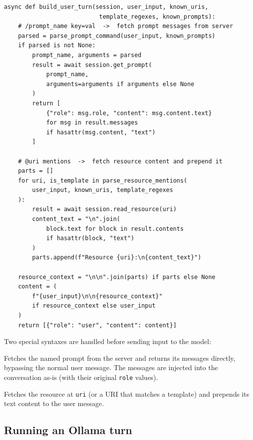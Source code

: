 \documentclass[11pt, a4paper]{article}
\begin{document}
\begin{lstlisting}[caption={build\_user\_turn}]
async def build_user_turn(session, user_input, known_uris,
                           template_regexes, known_prompts):
    # /prompt_name key=val  ->  fetch prompt messages from server
    parsed = parse_prompt_command(user_input, known_prompts)
    if parsed is not None:
        prompt_name, arguments = parsed
        result = await session.get_prompt(
            prompt_name,
            arguments=arguments if arguments else None
        )
        return [
            {"role": msg.role, "content": msg.content.text}
            for msg in result.messages
            if hasattr(msg.content, "text")
        ]

    # @uri mentions  ->  fetch resource content and prepend it
    parts = []
    for uri, is_template in parse_resource_mentions(
        user_input, known_uris, template_regexes
    ):
        result = await session.read_resource(uri)
        content_text = "\n".join(
            block.text for block in result.contents
            if hasattr(block, "text")
        )
        parts.append(f"Resource {uri}:\n{content_text}")

    resource_context = "\n\n".join(parts) if parts else None
    content = (
        f"{user_input}\n\n{resource_context}"
        if resource_context else user_input
    )
    return [{"role": "user", "content": content}]
\end{lstlisting}

Two special syntaxes are handled before sending input to the model:

\begin{description}[leftmargin=3em]
  \item[\texttt{/prompt\_name [key=val \ldots]}] Fetches the named prompt from the server and returns its messages directly, bypassing the normal user message. The messages are injected into the conversation as-is (with their original \texttt{role} values).
  \item[\texttt{@uri}] Fetches the resource at \texttt{uri} (or a URI that matches a template) and prepends its text content to the user message.
\end{description}

\subsection{Running an Ollama turn}
\end{document}
